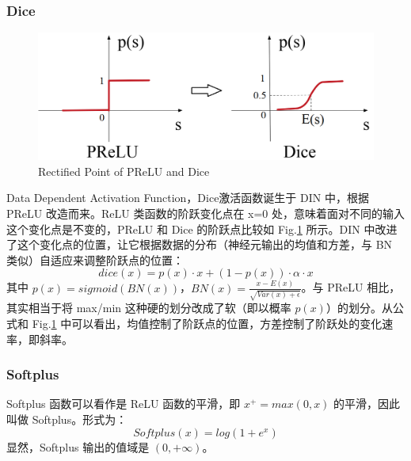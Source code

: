 \subsubsection{Dice}
\begin{figure}[h]
	\centering
	\includegraphics[width=.6\textwidth]{pics/prelu-dice.png}
	\caption{Rectified Point of PReLU and Dice}
	\label{fig:prelu_dice}
\end{figure}
Data Dependent Activation Function，Dice激活函数诞生于 DIN 中，根据 PReLU 改造而来。ReLU 类函数的阶跃变化点在 x=0 处，意味着面对不同的输入这个变化点是不变的，PReLU 和 Dice 的阶跃点比较如 Fig.\ref{fig:prelu_dice} 所示。DIN 中改进了这个变化点的位置，让它根据数据的分布（神经元输出的均值和方差，与 BN 类似）自适应来调整阶跃点的位置：
$$
dice(x) = p(x) \cdot x + (1 - p(x)) \cdot \alpha \cdot x
$$
其中 $p(x) = sigmoid( BN(x))$，$BN(x) = \frac{x - E(x)}{\sqrt{Var(x) + \epsilon}}$。与 PReLU 相比，其实相当于将 max/min 这种硬的划分改成了软（即以概率 $p(x)$）的划分。从公式和 Fig.\ref{fig:prelu_dice} 中可以看出，均值控制了阶跃点的位置，方差控制了阶跃处的变化速率，即斜率。

\subsubsection{Softplus}
Softplus 函数可以看作是 ReLU 函数的平滑，即 $x^+ = max(0, x)$ 的平滑，因此叫做 Softplus。形式为：
$$
Softplus(x) = log(1+e^x)
$$
显然，Softplus 输出的值域是 $(0, +\infty)$。
